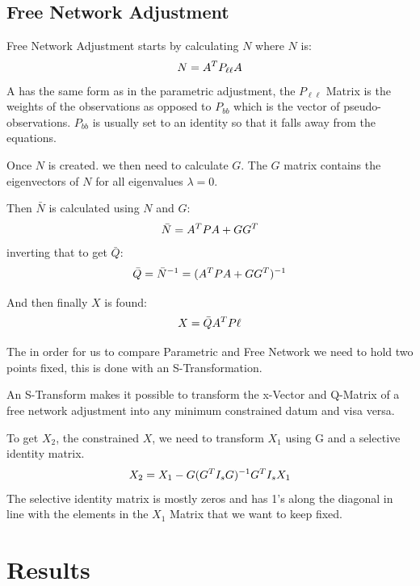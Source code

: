\documentclass[11pt,a4paper]{article}
\begin{document}
		
		\subsection{Free Network Adjustment}
		
		Free Network Adjustment starts by calculating $N$ where $N$ is:
		\begin{equation}
		\notag
		N = A^TP_{\ell\ell}A
		\end{equation}
		A has the same form as in the parametric adjustment, the $P_{\ell\ell}$ Matrix is the weights of the observations as opposed to $P_{bb}$ which is the vector of pseudo-observations. $P_{bb}$ is usually set to an identity so that it falls away from the equations.
		
		Once $N$ is created. we then need to calculate $G$. The $G$ matrix contains the eigenvectors of $N$ for all eigenvalues $\lambda = 0$.
		
		Then $\bar{N}$ is calculated using $N$ and $G$:
		\begin{equation}
		\notag
		\bar{N} = A^TPA + GG^T
		\end{equation}
		inverting that to get $\bar{Q}$:
		\begin{equation}
		\notag
		\bar{Q} = \bar{N}^{-1} = (A^TPA + GG^T)^{-1}
		\end{equation}
		
		And then finally $X$ is found:
		\begin{equation}
		\notag
		X = \bar{Q} A^TP\ell	
		\end{equation}
	
		The in order for us to compare Parametric and Free Network we need to hold two points fixed, this is done with an S-Transformation.
		
		An S-Transform makes it possible to transform the x-Vector and Q-Matrix of a free network adjustment into any minimum constrained datum and visa versa.
		
		To get $X_2$, the constrained $X$, we need to transform $X_1$ using G and a selective identity matrix.
		\begin{equation}
		\notag
		X_2 = X_1 - G(G^TI_sG)^{-1} G^T I_s X_1
		\end{equation}
		The selective identity matrix is mostly zeros and has 1's along the diagonal in line with the elements in the $X_1$ Matrix that we want to keep fixed.
		
	\section{Results}
	
\end{document}
